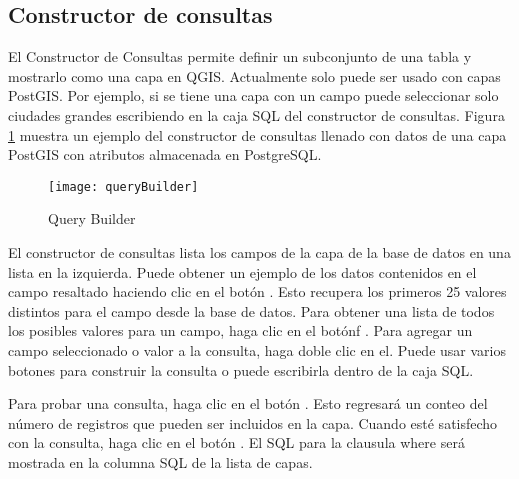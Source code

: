 \subsection{Constructor de consultas}\label{sec:query_builder}

El Constructor de Consultas permite definir un subconjunto de una tabla y mostrarlo como una capa en QGIS. Actualmente solo puede ser usado con capas PostGIS. 
Por ejemplo, si se tiene una capa  con un campo  puede seleccionar solo ciudades grandes escribiendo  en la caja SQL del constructor de consultas. Figura
\ref{fig:query_builder} muestra un ejemplo del constructor de consultas llenado con datos de una capa PostGIS con atributos almacenada en PostgreSQL. 

\begin{figure}[ht]
  \begin{center}
    \caption{Query Builder \nixcaption}\label{fig:query_builder}\smallskip
    \texttt{[image: queryBuilder]}
  \end{center}  
\end{figure}

El constructor de consultas  lista los campos de la capa de la base de datos en una lista en la izquierda. Puede obtener un ejemplo de los datos contenidos en el campo resaltado haciendo clic en el bot\'on  . Esto recupera los primeros 25 valores distintos para el campo desde la base de datos. Para obtener una lista de todos los posibles valores para un campo, haga clic en el bot\'onf  . Para agregar un campo seleccionado o valor a la consulta, haga doble clic en el. Puede usar varios botones para construir la consulta o puede escribirla dentro de la caja SQL.

Para probar una consulta, haga clic en el bot\'on  . Esto regresar\'a un conteo del n\'umero de registros que pueden ser incluidos en la capa. Cuando est\'e satisfecho con la consulta, haga clic en el bot\'on . El SQL para la clausula where ser\'a mostrada en la columna SQL de la lista de capas.

\begin{Tip}\caption{\textsc{Cambiar la Definici\'on de la Capa}}
\end{Tip}

